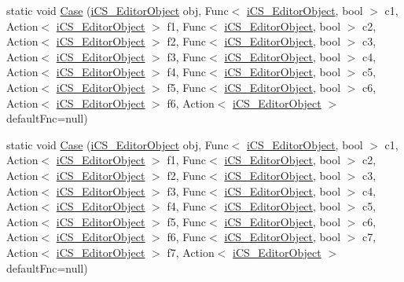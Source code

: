 \begin{DoxyCompactItemize}
static void \hyperlink{classi_c_s___i_storage_ad2c23f826baabddffb1f87426e83f4ac}{Case} (\hyperlink{classi_c_s___editor_object}{i\+C\+S\+\_\+\+Editor\+Object} obj, Func$<$ \hyperlink{classi_c_s___editor_object}{i\+C\+S\+\_\+\+Editor\+Object}, bool $>$ c1, Action$<$ \hyperlink{classi_c_s___editor_object}{i\+C\+S\+\_\+\+Editor\+Object} $>$ f1, Func$<$ \hyperlink{classi_c_s___editor_object}{i\+C\+S\+\_\+\+Editor\+Object}, bool $>$ c2, Action$<$ \hyperlink{classi_c_s___editor_object}{i\+C\+S\+\_\+\+Editor\+Object} $>$ f2, Func$<$ \hyperlink{classi_c_s___editor_object}{i\+C\+S\+\_\+\+Editor\+Object}, bool $>$ c3, Action$<$ \hyperlink{classi_c_s___editor_object}{i\+C\+S\+\_\+\+Editor\+Object} $>$ f3, Func$<$ \hyperlink{classi_c_s___editor_object}{i\+C\+S\+\_\+\+Editor\+Object}, bool $>$ c4, Action$<$ \hyperlink{classi_c_s___editor_object}{i\+C\+S\+\_\+\+Editor\+Object} $>$ f4, Func$<$ \hyperlink{classi_c_s___editor_object}{i\+C\+S\+\_\+\+Editor\+Object}, bool $>$ c5, Action$<$ \hyperlink{classi_c_s___editor_object}{i\+C\+S\+\_\+\+Editor\+Object} $>$ f5, Func$<$ \hyperlink{classi_c_s___editor_object}{i\+C\+S\+\_\+\+Editor\+Object}, bool $>$ c6, Action$<$ \hyperlink{classi_c_s___editor_object}{i\+C\+S\+\_\+\+Editor\+Object} $>$ f6, Action$<$ \hyperlink{classi_c_s___editor_object}{i\+C\+S\+\_\+\+Editor\+Object} $>$ default\+Fnc=null)
\item 
static void \hyperlink{classi_c_s___i_storage_a2275c3190b5bdc9ca72dc01ad7220e32}{Case} (\hyperlink{classi_c_s___editor_object}{i\+C\+S\+\_\+\+Editor\+Object} obj, Func$<$ \hyperlink{classi_c_s___editor_object}{i\+C\+S\+\_\+\+Editor\+Object}, bool $>$ c1, Action$<$ \hyperlink{classi_c_s___editor_object}{i\+C\+S\+\_\+\+Editor\+Object} $>$ f1, Func$<$ \hyperlink{classi_c_s___editor_object}{i\+C\+S\+\_\+\+Editor\+Object}, bool $>$ c2, Action$<$ \hyperlink{classi_c_s___editor_object}{i\+C\+S\+\_\+\+Editor\+Object} $>$ f2, Func$<$ \hyperlink{classi_c_s___editor_object}{i\+C\+S\+\_\+\+Editor\+Object}, bool $>$ c3, Action$<$ \hyperlink{classi_c_s___editor_object}{i\+C\+S\+\_\+\+Editor\+Object} $>$ f3, Func$<$ \hyperlink{classi_c_s___editor_object}{i\+C\+S\+\_\+\+Editor\+Object}, bool $>$ c4, Action$<$ \hyperlink{classi_c_s___editor_object}{i\+C\+S\+\_\+\+Editor\+Object} $>$ f4, Func$<$ \hyperlink{classi_c_s___editor_object}{i\+C\+S\+\_\+\+Editor\+Object}, bool $>$ c5, Action$<$ \hyperlink{classi_c_s___editor_object}{i\+C\+S\+\_\+\+Editor\+Object} $>$ f5, Func$<$ \hyperlink{classi_c_s___editor_object}{i\+C\+S\+\_\+\+Editor\+Object}, bool $>$ c6, Action$<$ \hyperlink{classi_c_s___editor_object}{i\+C\+S\+\_\+\+Editor\+Object} $>$ f6, Func$<$ \hyperlink{classi_c_s___editor_object}{i\+C\+S\+\_\+\+Editor\+Object}, bool $>$ c7, Action$<$ \hyperlink{classi_c_s___editor_object}{i\+C\+S\+\_\+\+Editor\+Object} $>$ f7, Action$<$ \hyperlink{classi_c_s___editor_object}{i\+C\+S\+\_\+\+Editor\+Object} $>$ default\+Fnc=null)

\end{DoxyCompactItemize}

